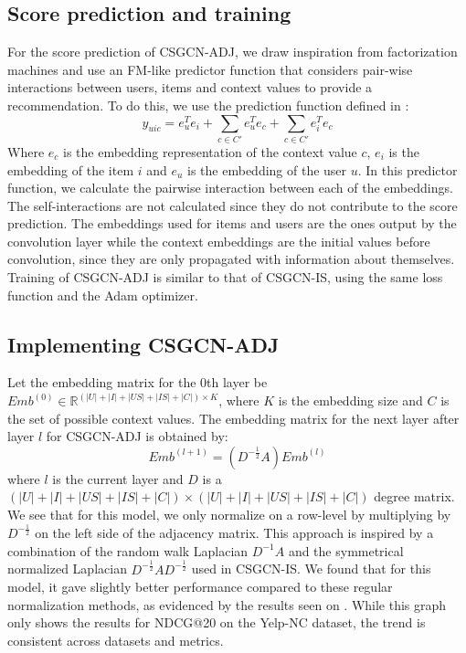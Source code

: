 \subsection{Score prediction and training}\label{subsec:csgcn_adj_score_pred}
For the score prediction of CSGCN-ADJ, we draw inspiration from factorization machines and use an FM-like predictor function that considers pair-wise interactions between users, items and context values to provide a recommendation.
To do this, we use the prediction function defined in :
\begin{equation}\label{eq:csgcn_adj_scorepred}
    \hat{y}_{uic} = e_u^Te_i + \sum_{c \in C'}e_u^Te_{c} + \sum_{c \in C'}e_i^Te_{c}
\end{equation}
Where $e_{c}$ is the embedding representation of the context value $c$, $e_i$ is the embedding of the item $i$ and $e_u$ is the embedding of the user $u$.
In this predictor function, we calculate the pairwise interaction between each of the embeddings.
The self-interactions are not calculated since they do not contribute to the score prediction.
The embeddings used for items and users are the ones output by the convolution layer while the context embeddings are the initial values before convolution, since they are only propagated with information about themselves.
\\
Training of CSGCN-ADJ is similar to that of CSGCN-IS, using the same loss function and the Adam optimizer.

\subsection{Implementing CSGCN-ADJ}
Let the embedding matrix for the 0th layer be $Emb^{(0)} \in \mathbb{R}^{(|U| + |I| + |US| + |IS| + |C|) \times K}$, where $K$ is the embedding size and $C$ is the set of possible context values.
The embedding matrix for the next layer after layer $l$ for CSGCN-ADJ is obtained by:
\begin{equation}
    Emb^{(l+1)} = (D^{-\frac{1}{2}}A)Emb^{(l)}
\end{equation}
where $l$ is the current layer and $D$ is a $(|U| + |I| + |US| + |IS| + |C|) \times (|U| + |I| + |US| + |IS|+ |C|)$ degree matrix. 
We see that for this model, we only normalize on a row-level by multiplying by $D^{-\frac{1}{2}}$ on the left side of the adjacency matrix.
This approach is inspired by a combination of the random walk Laplacian $D^{-1}A$ and the symmetrical normalized Laplacian $D^{-\frac{1}{2}}AD^{-\frac{1}{2}}$ used in CSGCN-IS.
We found that for this model, it gave slightly better performance compared to these regular normalization methods, as evidenced by the results seen on .
While this graph only shows the results for NDCG@20 on the Yelp-NC dataset, the trend is consistent across datasets and metrics.

